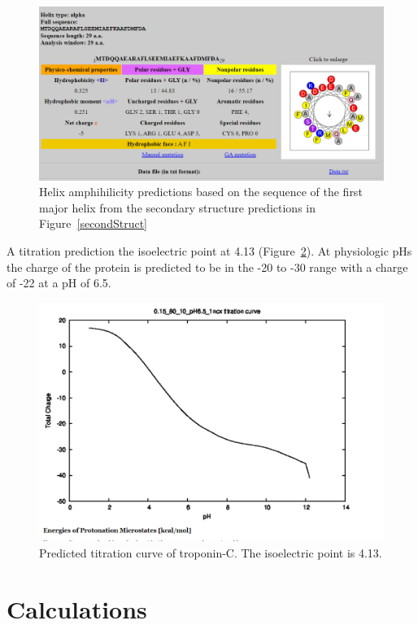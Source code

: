 \documentclass[12pt]{article}
\begin{document}
\begin{figure}[H]
	\centering
	\includegraphics[width=.95\linewidth]{Helix1_plot.png}
	
	\caption{Helix amphihilicity predictions based on the sequence of the first major helix from the secondary structure predictions in Figure~\ref{secondStruct}}
	\label{helix1}
\end{figure}

A titration prediction the isoelectric point at 4.13 (Figure~\ref{titration}). At physiologic pHs the charge of the protein is predicted to be in the -20 to -30 range with a charge of -22 at a pH of 6.5.

\begin{figure}[H]
	\centering
	\includegraphics[width=.95\linewidth]{ComputedTitration.png}
	
	\caption{Predicted titration curve of troponin-C. The isoelectric point is 4.13.}
	\label{titration}
\end{figure}
\section{Calculations}
\end{document}
